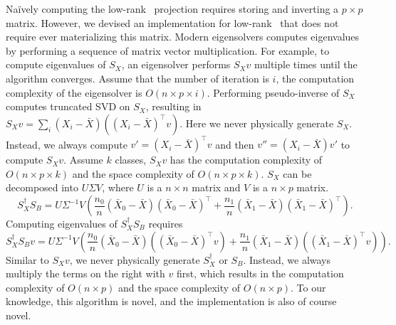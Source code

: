 \documentclass[11pt]{extarticle}
\begin{document}
Na\"ively computing the low-rank \Cca~projection requires storing and inverting a $p \times p$ matrix.  However, we devised an implementation for low-rank \Cca~that does not require ever materializing this matrix. Modern eigensolvers computes eigenvalues by performing a sequence of matrix vector multiplication. For example, to compute eigenvalues of $S_{X}$, an eigensolver performs $S_{X} v$ multiple times until the algorithm converges. Assume that the number of iteration is $i$, the computation complexity of the eigensolver is $O(n \times p \times i)$. Performing pseudo-inverse of $S_{X}$ computes truncated SVD on $S_{X}$, resulting in $S_{X} v = \sum_{i} (X_i - \bar{X}) ((X_i - \bar{X})^{\top} v)$.
Here we never physically generate $S_X$. Instead, we always compute $v' = (X_i - \bar{X})^{\top} v$ and then $v'' = (X_i - \bar{X}) v'$ to compute $S_{X} v$.
Assume $k$ classes, $S_{X} v$ has the computation complexity of $O(n \times p \times k)$ and the space complexity of $O(n \times p \times k)$. $S_{X}$ can be decomposed into
$U \Sigma V$, where $U$ is a $n \times n$ matrix and $V$ is a $n \times p$ matrix.
$$S_{X}^{\dagger} S_{B} = U \Sigma^{-1} V (\frac{n_0}{n} (\bar{X}_0 - \bar{X}) (\bar{X}_0 - \bar{X})^{\top} + \frac{n_1}{n} (\bar{X}_1 - \bar{X}) (\bar{X}_1 - \bar{X})^{\top}).$$
Computing eigenvalues of $S_{X}^{\dagger} S_{B}$ requires
$$S_{X}^{\dagger} S_{B} v = U \Sigma^{-1} V (\frac{n_0}{n} (\bar{X}_0 - \bar{X}) ((\bar{X}_0 - \bar{X})^{\top} v) + \frac{n_1}{n} (\bar{X}_1 - \bar{X}) ((\bar{X}_1 - \bar{X})^{\top} v)).$$
Similar to $S_{X} v$, we never physically generate $S_{X}^{\dagger}$ or $S_{B}$. Instead, we always multiply the terms on the right with $v$ first, which results in
the computation complexity of $O(n \times p)$ and the space complexity of $O(n \times p)$. To our knowledge, this algorithm is novel, and the implementation is also of course novel.
\end{document}
